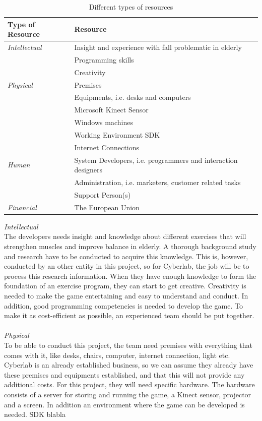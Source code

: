 \begin{table}
\centering
    \begin{tabular}{|l|l|}
        \hline
       \textbf{Type of Resource} & \textbf{Resource}  \\ \hline
       \emph{Intellectual} & Insight and experience with fall problematic in elderly \\ \cline{2-2}
        & Programming skills \\ \cline{2-2}
	 	& Creativity \\ \hline
	   \emph{Physical} & Premises \\ \cline{2-2}
	   	& Equipments, i.e. desks and computers  \\ \cline{2-2}
	   	& Microsoft Kinect Sensor \\ \cline{2-2}
	   	& Windows machines \\ \cline{2-2}
	   	& Working Environment SDK \\ \cline{2-2}
	   	& Internet Connections \\ \hline
	   \emph{Human} & System Developers, i.e. programmers and interaction designers \\ \cline{2-2}
	   	& Administration, i.e. marketers, customer related tasks \\ \cline{2-2}
	   	& Support Person(s) \\ \hline
	   \emph{Financial} & The European Union \\
        \hline
    \end{tabular}
    \caption[Resources]{Different types of resources}
    \label{tab:Resources}
\end{table} 
\emph{Intellectual} \\ The developers needs insight and knowledge about different exercises that will strengthen muscles and improve balance in elderly. A thorough background study and research have to be conducted to acquire this knowledge. This is, however, conducted by an other entity in this project, so for Cyberlab, the job will be to process this research information. When they have enough knowledge to form the foundation of an exercise program, they can start to get creative. Creativity is needed to make the game entertaining and easy to understand and conduct. In addition, good programming competencies is needed to develop the game. To make it as cost-efficient as possible, an experienced team should be put together. \\ \\
\emph{Physical} \\ To be able to conduct this project, the team need premises with everything that comes with it, like desks, chairs, computer, internet connection, light etc. Cyberlab is an already established business, so we can assume they already have these premises and equipments established, and that this will not provide any additional costs. For this project, they will need specific hardware. The hardware consists of a server for storing and running the game, a Kinect sensor, projector and a screen. In addition an environment where the game can be developed is needed. SDK blabla\\ \\
